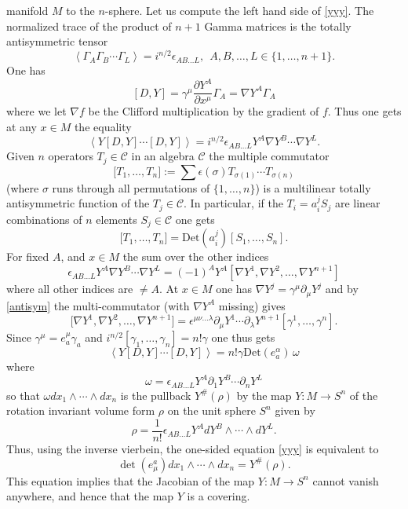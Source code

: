 \documentclass[12pt]{article}
\begin{document}
manifold $M$ to the $n$-sphere. Let us compute the left hand side of \eqref{yyy}. The normalized trace of the
product of $n+1$ Gamma matrices is the totally antisymmetric tensor
\[
\left\langle \Gamma_{A}\Gamma_{B}\cdots\Gamma_{L}\right\rangle =i^{n/2}%
\epsilon_{AB\ldots L},\ \ A,B,\ldots,L\in\{1,\ldots,n+1\}.
\]
One has $$\left[  D,Y\right]  =\gamma^{\mu}\frac{\partial Y^{A}}{\partial
x^{\mu}}\Gamma_{A}=\nabla Y^{A}\Gamma_{A}$$ where we let $\nabla f$ be the
Clifford multiplication by the gradient of $f$. Thus one gets at any $x\in M$
the equality
$$
\left\langle Y\left[  D,Y\right]  \cdots\left[  D,Y\right]  \right\rangle
=i^{n/2}\epsilon_{AB\ldots L}Y^{A}\nabla Y^{B}\cdots\nabla Y^{L}.%
$$
Given $n$ operators $T_{j}\in\mathcal{C}$ in
an algebra $\mathcal{C}$ the multiple commutator
\[
\lbrack T_{1},\ldots,T_{n}]:=\sum\epsilon(\sigma)T_{\sigma(1)}\cdots
T_{\sigma(n)}
\]
(where $\sigma$ runs through all permutations of $\{1,\ldots,n\}$) is a
multilinear totally antisymmetric function of the $T_{j}\in\mathcal{C}$. In
particular, if the $T_{i}=a_{i}^{j}S_{j}$ are linear combinations of $n$
elements $S_{j}\in\mathcal{C}$ one gets
\begin{equation}\label{antisym}
\lbrack T_{1},\ldots,T_{n}]=\mathrm{Det}(a_{i}^{j})[S_{1},\ldots
,S_{n}].
\end{equation}
For fixed $A$, and $x\in M$ the sum over the other indices
\[
\epsilon_{AB\ldots L}Y^{A}\nabla Y^{B}\cdots\nabla Y^{L}=(-1)^{A}Y^{A}[\nabla
Y^{1},\nabla Y^{2},\ldots,\nabla Y^{n+1}]
\]
where all other indices are $\neq A$. At $x\in M$ one has $\nabla Y^{j}
=\gamma^{\mu}\partial_{\mu}Y^{j}$ and by \eqref{antisym} the multi-commutator
(with $\nabla Y^{A}$ missing) gives
\[
\lbrack\nabla Y^{1},\nabla Y^{2},\ldots,\nabla Y^{n+1}]=\epsilon^{\mu\nu
\ldots\lambda}\partial_{\mu}Y^{1}\cdots\partial_{\lambda}Y^{n+1}[\gamma
^{1},\ldots,\gamma^{n}].
\]
Since $\gamma^{\mu}=e_{a}^{\mu}\gamma_{a}$ and $i^{n/2}[\gamma_{1}
,\ldots,\gamma_{n}]=n!\gamma$ one thus gets 
$$
\left\langle Y\left[  D,Y\right]  \cdots\left[  D,Y\right]  \right\rangle
=n!\gamma\mathrm{Det}(e_{a}^{\alpha})\,\omega\label{expectY}%
$$
where
\[
\omega=\epsilon_{AB\ldots L}Y^{A}\partial_{1}Y^{B}\cdots\partial_{n}Y^{L}%
\]
so that $\omega dx_{1}\wedge\cdots\wedge dx_{n}$ is the pullback $Y^{\#}%
(\rho)$ by the map $Y:M\rightarrow S^{n}$ of the rotation invariant volume
form $\rho$ on the unit sphere $S^{n}$ given by
\[
\rho=\frac{1}{n!}\epsilon_{AB\ldots L}Y^{A}dY^{B}\wedge\cdots\wedge dY^{L}.%
\]
Thus, using the inverse vierbein, the one-sided equation \eqref{yyy} is
equivalent to
$$
\det\left(  e_{\mu}^{a}\right)  dx_{1}\wedge\cdots\wedge dx_{n}=Y^{\#}
(\rho). 
$$
This equation  implies that the Jacobian of the map
$Y:M\rightarrow S^{n}$ cannot vanish anywhere, and hence that the map $Y$ is a
covering.
\end{document}
